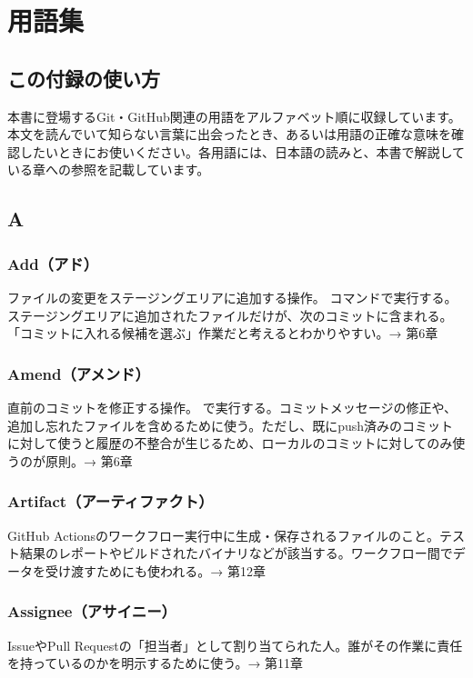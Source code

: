 \chapter{用語集}

\section*{この付録の使い方}

本書に登場するGit・GitHub関連の用語をアルファベット順に収録しています。本文を読んでいて知らない言葉に出会ったとき、あるいは用語の正確な意味を確認したいときにお使いください。各用語には、日本語の読みと、本書で解説している章への参照を記載しています。

\section*{A}

\subsection*{Add（アド）}
ファイルの変更をステージングエリアに追加する操作。 コマンドで実行する。ステージングエリアに追加されたファイルだけが、次のコミットに含まれる。「コミットに入れる候補を選ぶ」作業だと考えるとわかりやすい。→ 第6章

\subsection*{Amend（アメンド）}
直前のコミットを修正する操作。 で実行する。コミットメッセージの修正や、追加し忘れたファイルを含めるために使う。ただし、既にpush済みのコミットに対して使うと履歴の不整合が生じるため、ローカルのコミットに対してのみ使うのが原則。→ 第6章

\subsection*{Artifact（アーティファクト）}
GitHub Actionsのワークフロー実行中に生成・保存されるファイルのこと。テスト結果のレポートやビルドされたバイナリなどが該当する。ワークフロー間でデータを受け渡すためにも使われる。→ 第12章

\subsection*{Assignee（アサイニー）}
IssueやPull Requestの「担当者」として割り当てられた人。誰がその作業に責任を持っているのかを明示するために使う。→ 第11章

